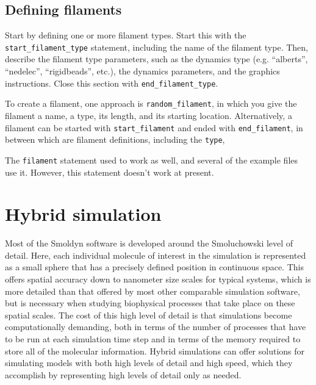 \documentclass {scrbook}
\newcommand {\ttt} {\texttt}
\begin{document}
\section{Defining filaments}

Start by defining one or more filament types. Start this with the \ttt{start\_filament\_type} statement, including the name of the filament type. Then, describe the filament type parameters, such as the dynamics type (e.g. ``alberts'', ``nedelec'', ``rigidbeads'', etc.), the dynamics parameters, and the graphics instructions. Close this section with \ttt{end\_filament\_type}.

To create a filament, one approach is \ttt{random\_filament}, in which you give the filament a name, a type, its length, and its starting location. Alternatively, a filament can be started with \ttt{start\_filament} and ended with \ttt{end\_filament}, in between which are filament definitions, including the \ttt{type}, 

The \ttt{filament} statement used to work as well, and several of the example files use it. However, this statement doesn't work at present.

\chapter{Hybrid simulation}

Most of the Smoldyn software is developed around the Smoluchowski level of detail. Here, each individual molecule of interest in the simulation is represented as a small sphere that has a precisely defined position in continuous space. This offers spatial accuracy down to nanometer size scales for typical systems, which is more detailed than that offered by most other comparable simulation software, but is necessary when studying biophysical processes that take place on these spatial scales. The cost of this high level of detail is that simulations become computationally demanding, both in terms of the number of processes that have to be run at each simulation time step and in terms of the memory required to store all of the molecular information. Hybrid simulations can offer solutions for simulating models with both high levels of detail and high speed, which they accomplish by representing high levels of detail only as needed.
\end{document}
